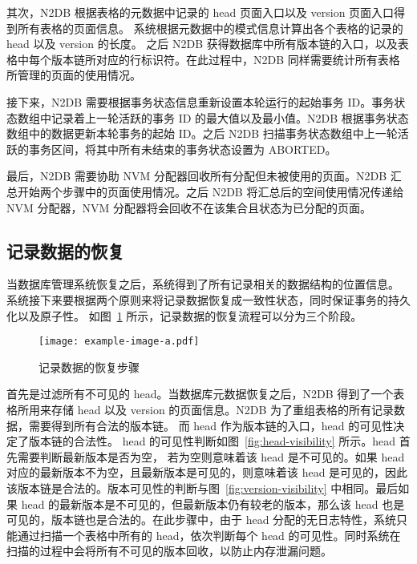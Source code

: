 其次，N2DB 根据表格的元数据中记录的 head 页面入口以及 version 页面入口得到所有表格的页面信息。
系统根据元数据中的模式信息计算出各个表格的记录的 head 以及 version 的长度。
之后 N2DB 获得数据库中所有版本链的入口，以及表格中每个版本链所对应的行标识符。在此过程中，N2DB 同样需要统计所有表格所管理的页面的使用情况。

接下来，N2DB 需要根据事务状态信息重新设置本轮运行的起始事务 ID。事务状态数组中记录着上一轮活跃的事务 ID 的最大值以及最小值。N2DB 根据事务状态数组中的数据更新本轮事务的起始 ID。之后 N2DB 扫描事务状态数组中上一轮活跃的事务区间，将其中所有未结束的事务状态设置为 ABORTED。

最后，N2DB 需要协助 NVM 分配器回收所有分配但未被使用的页面。N2DB 汇总开始两个步骤中的页面使用情况。之后 N2DB 将汇总后的空间使用情况传递给 NVM 分配器，NVM 分配器将会回收不在该集合且状态为已分配的页面。



\subsection{记录数据的恢复}
\label{ssec:record-recovery}

当数据库管理系统恢复之后，系统得到了所有记录相关的数据结构的位置信息。
系统接下来要根据两个原则来将记录数据恢复成一致性状态，同时保证事务的持久化以及原子性。
如图~\ref{fig:record-recovery} 所示，记录数据的恢复流程可以分为三个阶段。

\begin{figure}[ht]
    \centering
    \texttt{[image: example-image-a.pdf]}
    \caption{记录数据的恢复步骤}
    \label{fig:record-recovery}
\end{figure}

首先是过滤所有不可见的 head。当数据库元数据恢复之后，N2DB 得到了一个表格所用来存储 head 以及 version 的页面信息。N2DB 为了重组表格的所有记录数据，需要得到所有合法的版本链。
而 head 作为版本链的入口，head 的可见性决定了版本链的合法性。
head 的可见性判断如图~\ref{fig:head-visibility} 所示。head 首先需要判断最新版本是否为空，
若为空则意味着该 head 是不可见的。如果 head 对应的最新版本不为空，且最新版本是可见的，则意味着该 head 是可见的，因此该版本链是合法的。版本可见性的判断与图~\ref{fig:version-visibility} 中相同。最后如果 head 的最新版本是不可见的，但最新版本仍有较老的版本，那么该 head 也是可见的，版本链也是合法的。在此步骤中，由于 head 分配的无日志特性，系统只能通过扫描一个表格中所有的 head，依次判断每个 head 的可见性。同时系统在扫描的过程中会将所有不可见的版本回收，以防止内存泄漏问题。

